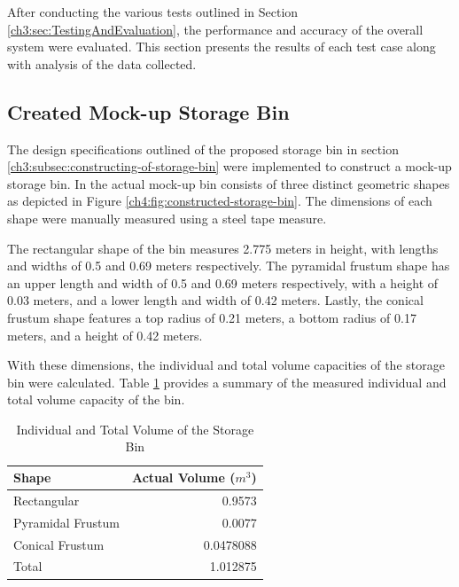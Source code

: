 After conducting the various tests outlined in Section \ref{ch3:sec:TestingAndEvaluation}, the performance and accuracy of the overall system were evaluated. This section presents the results of each test case along with analysis of the data collected.

\subsection{Created Mock-up Storage Bin}
The design specifications outlined of the proposed storage bin in section \ref{ch3:subsec:constructing-of-storage-bin} were implemented to construct a mock-up storage bin. In the actual mock-up bin consists of three distinct geometric shapes as depicted in Figure \ref{ch4:fig:constructed-storage-bin}. The dimensions of each shape were manually measured using a steel tape measure.

The rectangular shape of the bin measures 2.775 meters in height, with lengths and widths of 0.5 and 0.69 meters respectively. The pyramidal frustum shape has an upper length and width of 0.5 and 0.69 meters respectively, with a height of 0.03 meters, and a lower length and width of 0.42 meters. Lastly, the conical frustum shape features a top radius of 0.21 meters, a bottom radius of 0.17 meters, and a height of 0.42 meters.

With these dimensions, the individual and total volume capacities of the storage bin were calculated. Table \ref{ch4:tab:volume-calculation} provides a summary of the measured individual and total volume capacity of the bin. \\


\begin{table}[H]
	\centering
	\caption{Individual and Total Volume of the Storage Bin}
	\label{ch4:tab:volume-calculation}
	\begin{tabular}{l r}
		\toprule
		\textbf{Shape}    & \textbf{Actual Volume ($m^{3}$)} \\ \midrule

		Rectangular       & 0.9573                           \\

		Pyramidal Frustum & 0.0077                           \\

		Conical Frustum   & 0.0478088                        \\ \midrule

		Total             & 1.012875                         \\ \bottomrule
	\end{tabular}
\end{table}

